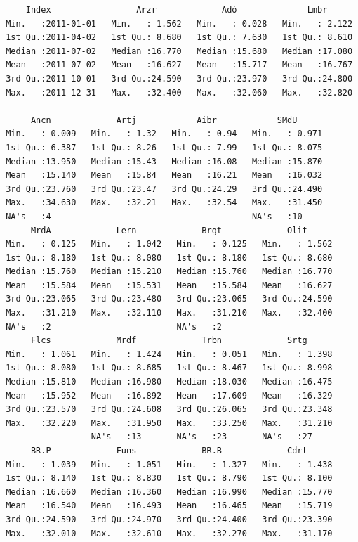 \documentclass[smallroyalvopaper]{memoir}
\begin{document}
\begin{verbatim}
     Index                 Arzr             Adó              Lmbr       
 Min.   :2011-01-01   Min.   : 1.562   Min.   : 0.028   Min.   : 2.122  
 1st Qu.:2011-04-02   1st Qu.: 8.680   1st Qu.: 7.630   1st Qu.: 8.610  
 Median :2011-07-02   Median :16.770   Median :15.680   Median :17.080  
 Mean   :2011-07-02   Mean   :16.627   Mean   :15.717   Mean   :16.767  
 3rd Qu.:2011-10-01   3rd Qu.:24.590   3rd Qu.:23.970   3rd Qu.:24.800  
 Max.   :2011-12-31   Max.   :32.400   Max.   :32.060   Max.   :32.820  
                                                                        
      Ancn             Artj            Aibr            SMdU       
 Min.   : 0.009   Min.   : 1.32   Min.   : 0.94   Min.   : 0.971  
 1st Qu.: 6.387   1st Qu.: 8.26   1st Qu.: 7.99   1st Qu.: 8.075  
 Median :13.950   Median :15.43   Median :16.08   Median :15.870  
 Mean   :15.140   Mean   :15.84   Mean   :16.21   Mean   :16.032  
 3rd Qu.:23.760   3rd Qu.:23.47   3rd Qu.:24.29   3rd Qu.:24.490  
 Max.   :34.630   Max.   :32.21   Max.   :32.54   Max.   :31.450  
 NA's   :4                                        NA's   :10      
      MrdA             Lern             Brgt             Olit       
 Min.   : 0.125   Min.   : 1.042   Min.   : 0.125   Min.   : 1.562  
 1st Qu.: 8.180   1st Qu.: 8.080   1st Qu.: 8.180   1st Qu.: 8.680  
 Median :15.760   Median :15.210   Median :15.760   Median :16.770  
 Mean   :15.584   Mean   :15.531   Mean   :15.584   Mean   :16.627  
 3rd Qu.:23.065   3rd Qu.:23.480   3rd Qu.:23.065   3rd Qu.:24.590  
 Max.   :31.210   Max.   :32.110   Max.   :31.210   Max.   :32.400  
 NA's   :2                         NA's   :2                        
      Flcs             Mrdf             Trbn             Srtg       
 Min.   : 1.061   Min.   : 1.424   Min.   : 0.051   Min.   : 1.398  
 1st Qu.: 8.080   1st Qu.: 8.685   1st Qu.: 8.467   1st Qu.: 8.998  
 Median :15.810   Median :16.980   Median :18.030   Median :16.475  
 Mean   :15.952   Mean   :16.892   Mean   :17.609   Mean   :16.329  
 3rd Qu.:23.570   3rd Qu.:24.608   3rd Qu.:26.065   3rd Qu.:23.348  
 Max.   :32.220   Max.   :31.950   Max.   :33.250   Max.   :31.210  
                  NA's   :13       NA's   :23       NA's   :27      
      BR.P             Funs             BR.B             Cdrt       
 Min.   : 1.039   Min.   : 1.051   Min.   : 1.327   Min.   : 1.438  
 1st Qu.: 8.140   1st Qu.: 8.830   1st Qu.: 8.790   1st Qu.: 8.100  
 Median :16.660   Median :16.360   Median :16.990   Median :15.770  
 Mean   :16.540   Mean   :16.493   Mean   :16.465   Mean   :15.719  
 3rd Qu.:24.590   3rd Qu.:24.970   3rd Qu.:24.400   3rd Qu.:23.390  
 Max.   :32.010   Max.   :32.610   Max.   :32.270   Max.   :31.170  
                                                                    

\end{verbatim}
\end{document}
